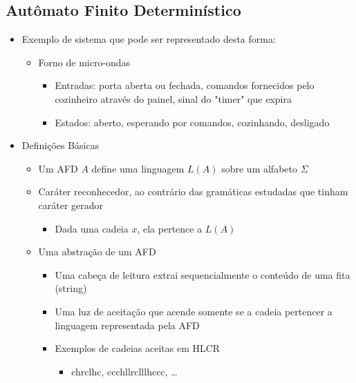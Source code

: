 \documentclass[12pt]{article}
\begin{document}
    \subsection{Autômato Finito Determinístico}
    \begin{itemize}
        \item Exemplo de sistema que pode ser representado desta forma: 
        \begin{itemize}
            \item Forno de micro-ondas
            \begin{itemize}
                \item Entradas: porta aberta ou fechada, comandos fornecidos 
                pelo cozinheiro através do painel, sinal do "timer" que expira 
                \item Estados: aberto, esperando por comandos, cozinhando, 
                desligado
            \end{itemize}
        \end{itemize}
        \item Definições Básicas
        \begin{itemize}
            \item Um AFD $A$ define uma linguagem $L(A)$ sobre um alfabeto $\Sigma$
            \item Caráter reconhecedor, ao contrário das gramáticas estudadas 
            que tinham caráter gerador
            \begin{itemize}
                \item Dada uma cadeia $x$, ela pertence a $L(A)$
            \end{itemize}
            \item Uma abstração de um AFD
            \begin{itemize}
                \item Uma cabeça de leitura extrai sequencialmente o conteúdo 
                de uma fita (string)
                \item Uma luz de aceitação que acende somente se a cadeia 
                pertencer a linguagem representada pela AFD
                \item Exemplos de cadeias aceitas em HLCR
                \begin{itemize}
                    \item chrclhc, ccchllrclllhccc, \ldots
                \end{itemize}
            \end{itemize}

\end{itemize}
\end{itemize}
\end{document}
